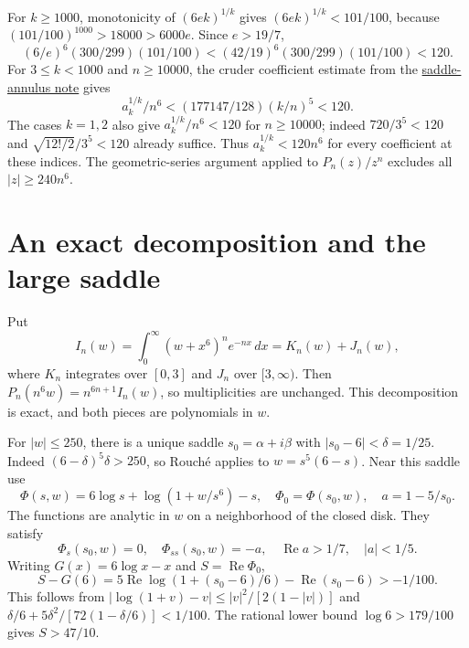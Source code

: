 \documentclass[11pt]{article}
\begin{document}
For $k\ge1000$, monotonicity of $(6ek)^{1/k}$ gives
$(6ek)^{1/k}<101/100$, because $(101/100)^{1000}>18000>6000e$.
Since $e>19/7$,
\[
 (6/e)^6(300/299)(101/100)
 <(42/19)^6(300/299)(101/100)<120.                      \tag{3}
\]
For $3\le k<1000$ and $n\ge10000$, the cruder coefficient estimate
from the \href{EFFECTIVE_SADDLE_ANNULUS.tex}{saddle-annulus note} gives
\[
 a_k^{1/k}/n^6<(177147/128)(k/n)^5<120.
\]
The cases $k=1,2$ also give $a_k^{1/k}/n^6<120$ for $n\ge10000$;
indeed $720/3^5<120$ and $\sqrt{12!/2}/3^5<120$ already suffice.
Thus $a_k^{1/k}<120n^6$ for every coefficient at these indices. The
geometric-series argument applied to $P_n(z)/z^n$ excludes all
$|z|\ge240n^6$.

\section{An exact decomposition and the large saddle}
Put
\[
 I_n(w)=\int_0^\infty(w+x^6)^ne^{-nx}\,dx
       =K_n(w)+J_n(w),
\]
where $K_n$ integrates over $[0,3]$ and $J_n$ over $[3,\infty)$.
Then $P_n(n^6w)=n^{6n+1}I_n(w)$, so multiplicities are unchanged.
This decomposition is exact, and both pieces are polynomials in $w$.

For $|w|\le250$, there is a unique saddle $s_0=\alpha+i\beta$ with
$|s_0-6|<\delta=1/25$. Indeed
$(6-\delta)^5\delta>250$, so Rouch\'e applies to
$w=s^5(6-s)$. Near this saddle use
\[
 \Phi(s,w)=6\log s+\log(1+w/s^6)-s,\quad
 \Phi_0=\Phi(s_0,w),\quad a=1-5/s_0.
\]
The functions are analytic in $w$ on a neighborhood of the closed disk.
They satisfy
\[
 \Phi_s(s_0,w)=0,\quad \Phi_{ss}(s_0,w)=-a,\quad
 \operatorname{Re}a>1/7,\quad |a|<1/5.                 \tag{4}
\]
Writing $G(x)=6\log x-x$ and $S=\operatorname{Re}\Phi_0$,
\[
 S-G(6)=5\operatorname{Re}\log(1+(s_0-6)/6)
          -\operatorname{Re}(s_0-6)>-1/100.             \tag{5}
\]
This follows from
$|\log(1+v)-v|\le|v|^2/[2(1-|v|)]$ and
$\delta/6+5\delta^2/[72(1-\delta/6)]<1/100$.
The rational lower bound $\log6>179/100$ gives $S>47/10$.
\end{document}

